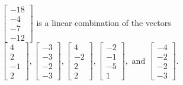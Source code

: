 \begin{exercise}
\begin{exerciseStatement}
  \end{exerciseStatement}
  \begin{exerciseAnswer}
   \(\left[\begin{array}{c}
-18 \\
-4 \\
-7 \\
-12
\end{array}\right]\) 
  	 is  
	a linear combination of the vectors \(\left[\begin{array}{c}
4 \\
2 \\
-1 \\
2
\end{array}\right] , \left[\begin{array}{c}
-3 \\
-3 \\
-2 \\
-3
\end{array}\right] , \left[\begin{array}{c}
4 \\
-2 \\
2 \\
2
\end{array}\right] , \left[\begin{array}{c}
-2 \\
-1 \\
-5 \\
1
\end{array}\right] , \text{ and } \left[\begin{array}{c}
-4 \\
-2 \\
-2 \\
-3
\end{array}\right]\).

	
  


  \end{exerciseAnswer}
\end{exercise}